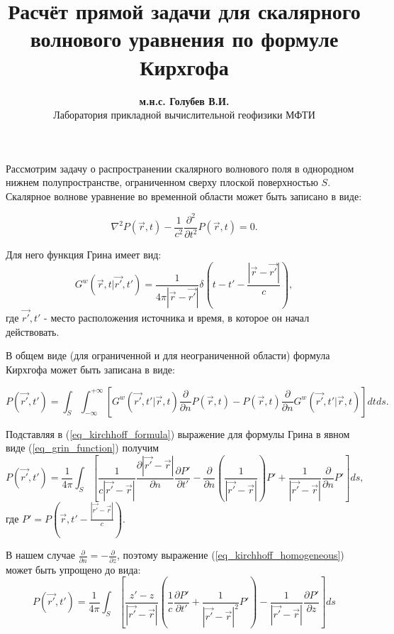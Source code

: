 \documentclass{article}
\begin{document}
\title{Расчёт прямой задачи для скалярного волнового уравнения по формуле Кирхгофа}
\author{\textbf{м.н.с. Голубев В.И.} \\ Лаборатория прикладной вычислительной геофизики МФТИ}
\maketitle
Рассмотрим задачу о распространении скалярного волнового поля в однородном нижнем полупространстве,
ограниченном сверху плоской поверхностью $S$.
Скалярное волнове уравнение во временной области может быть записано в виде:

\begin{equation}
\label{eq_wave_equation}
\nabla^2 P(\vec{r}, t) - \frac{1}{c^2}\frac{\partial^2}{\partial t^2}P(\vec{r}, t) = 0.
\end{equation}

Для него функция Грина имеет вид:
\begin{equation}
\label{eq_grin_function}
G^w(\vec{r}, t | \vec{r'}, t') = \frac{1}{4\pi|\vec{r} - \vec{r'}|}\delta(t - t' - \frac{|\vec{r} -
\vec{r'}|}{c}),
\end{equation}
где $\vec{r'}, t'$ - место расположения источника и время, в которое он начал действовать.

В общем виде (для ограниченной и для неограниченной области) формула Кирхгофа может быть записана
в виде:

\begin{equation}
\label{eq_kirchhoff_formula}
P(\vec{r'}, t') = \int_S \int_{-\infty}^{+\infty} [G^w(\vec{r'}, t' | \vec{r}, t) \frac{\partial}
{\partial n} P(\vec{r}, t) - P(\vec{r}, t) \frac{\partial}{\partial n} G^w(\vec{r'}, t' |
\vec{r}, t)] dt ds.
\end{equation}

Подставляя в (\ref{eq_kirchhoff_formula}) выражение для формулы Грина в явном виде (\ref{eq_grin_function}) получим
\begin{equation}
\label{eq_kirchhoff_homogeneous}
P(\vec{r'}, t') = \frac{1}{4\pi} \int_S [\frac{1}{c|\vec{r'} - \vec{r}|}
\frac{\partial |\vec{r'} - \vec{r}|}{\partial n}\frac{\partial P'}{\partial t'}
- \frac{\partial}{\partial n}(\frac{1}{|\vec{r'} - \vec{r}|}) P' + 
\frac{1}{|\vec{r'} - \vec{r}|}\frac{\partial}{\partial n}P'] ds,
\end{equation}
где $P' = P(\vec{r}, t' - \frac{|\vec{r'} - \vec{r}|}{c})$.

В нашем случае $\frac{\partial}{\partial n} = -\frac{\partial}{\partial z}$, поэтому выражение
(\ref{eq_kirchhoff_homogeneous}) может быть упрощено до вида:
\begin{equation}
\label{eq_kirchhoff_final}
P(\vec{r'}, t') = \frac{1}{4\pi} \int_S [\frac{z' - z}{|\vec{r'} - \vec{r}|}(\frac{1}{c}
\frac{\partial P'}{\partial t'} + \frac{1}{|\vec{r'} - \vec{r}|^2} P') - \frac{1}{|\vec{r'}
- \vec{r}|}\frac{\partial P'}{\partial z}] ds
\end{equation}
\end{document}
